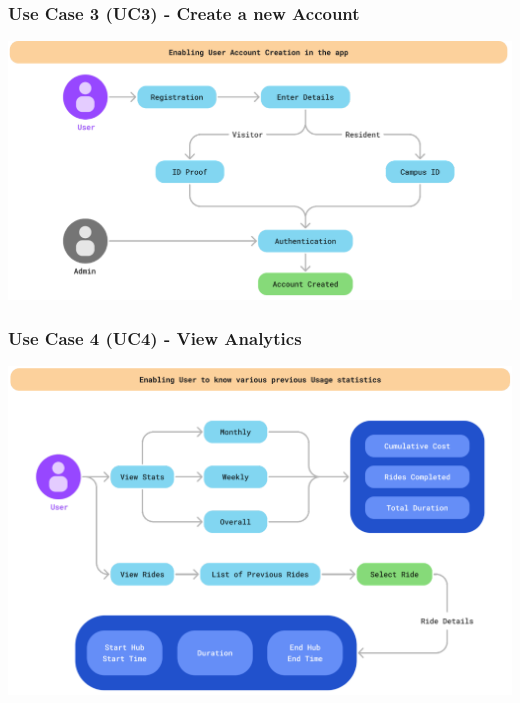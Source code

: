 \documentclass[11pt]{article}
\begin{document}
\subsubsection{Use Case 3 (UC3) - Create a new Account}
\begin{center}
  \includegraphics[scale=0.5]{../srs/usecase-3.png}
\end{center}

\subsubsection{Use Case 4 (UC4) - View Analytics}
\begin{center}
  \includegraphics[scale=0.5]{../srs/usecase-4.png}
\end{center}
\end{document}
